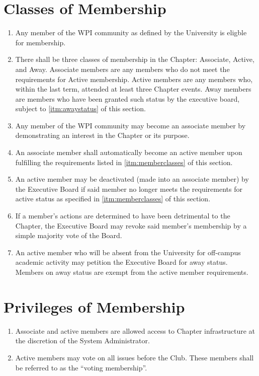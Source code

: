 \documentclass[12pt, letterpaper, oneside]{book}
\begin{document}
\section{Classes of Membership} \label{sec:memberclasses}
\begin{enumerate}
    \item Any member of the WPI community as defined by the University is
        eligble for membership.
    \item \label{itm:memberclasses} There shall be three classes of membership in the Chapter: Associate,
        Active, and Away.
        \subitem Associate members are any members who do not meet the
        requirements for Active membership.
        \subitem Active members are any members who, within the last
        term, attended at least three Chapter events.
        \subitem Away members are members who have been granted such status by
        the executive board, subject to \cref{itm:awaystatus} of this section.
    \item \label{itm:associate} Any member of the WPI community may become an
        associate member by demonstrating an interest in the Chapter or its
        purpose.
    \item \label{itm:activation} An associate member shall automatically become
        an active member upon fulfilling the requirements listed in
        \cref{itm:memberclasses} of this section.
    \item \label{itm:deactivation} An active member may be deactivated (made
        into an associate member) by the Executive Board if said member no
        longer meets the requirements for active status as specified in
        \cref{itm:memberclasses} of this section.
    \item \label{itm:expulsion} If a member's actions are determined to have
        been detrimental to the Chapter, the Executive Board may revoke said
        member's membership by a simple majority vote of the Board.
    \item \label{itm:awaystatus} An active member who will be absent from the
        University for off-campus academic activity may petition the Executive
        Board for away status. Members on away status are exempt from the
        active member requirements.
\end{enumerate}

\section{Privileges of Membership}
\begin{enumerate}
    \item Associate and active members are allowed access to Chapter
        infrastructure at the discretion of the System Administrator.
    \item Active members may vote on all issues before the Club. These members
        shall be referred to as the ``voting membership''.
\end{enumerate}
\end{document}
